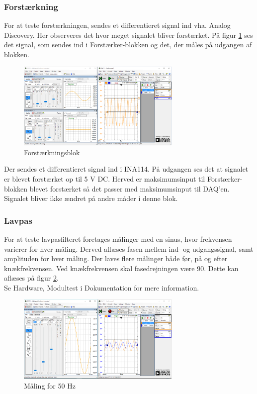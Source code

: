 \subsubsection{Forstærkning}
For at teste forstærkningen, sendes et differentieret signal ind vha. Analog Discovery. Her observeres det hvor meget signalet bliver forstærket. 
På figur \ref{fig:forstaerkning} ses det signal, som sendes ind i Forstærker-blokken og det, der måles på udgangen af blokken. 
\begin{figure}[H]
	\centering
	\includegraphics[width=0.7\textwidth]{Figurer/forst_blok}
	\caption{Forstærkningsblok}
	\label{fig:forstaerkning}
\end{figure}
Der sendes et differentieret signal ind i INA114. På udgangen ses det at signalet er blevet forstærket op til 5 V DC. Herved er maksimumsinput til Forstærker-blokken blevet forstærket så det passer med maksimumsinput til DAQ'en. Signalet bliver ikke ændret på andre måder i denne blok.

\subsubsection{Lavpas}
For at teste lavpasfilteret foretages målinger med en sinus, hvor frekvensen varierer for hver måling. Derved aflæses fasen mellem ind- og udgangssignal, samt amplituden for hver måling. Der laves flere målinger både før, på og efter knækfrekvensen. 
Ved knækfrekvensen skal fasedrejningen være 90\textdegree. Dette kan aflæses på figur \ref{fig:maeling50Hz}.\\
Se Hardware, Modultest i Dokumentation for mere information.  
\begin{figure}[H]
	\centering
	\includegraphics[width=0.7\textwidth]{Figurer/50Hz}
	\caption{Måling for 50 Hz}
	\label{fig:maeling50Hz}
\end{figure}


